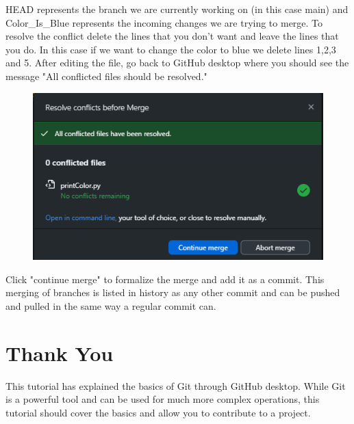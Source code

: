 \documentclass[10pt,twocolumn]{article}
\begin{document}
    HEAD represents the branch we are currently working on (in this case main) and Color\_Is\_Blue represents the incoming changes we are trying to merge. To resolve the conflict delete the lines that you don't want and leave the lines that you do. In this case if we want to change the color to blue we delete lines 1,2,3 and 5. After editing the file, go back to GitHub desktop where you should see the message "All conflicted files should be resolved."
    \begin{figure}
        \centering
        \includegraphics[width=0.5\linewidth]{FilesResolved.png}
    \end{figure}
    Click "continue merge" to formalize the merge and add it as a commit. This merging of branches is listed in history as any other commit and can be pushed and pulled in the same way a regular commit can.

\section{Thank You}

    This tutorial has explained the basics of Git through GitHub desktop. While Git is a powerful tool and can be used for much more complex operations, this tutorial should cover the basics and allow you to contribute to a project.
\end{document}
